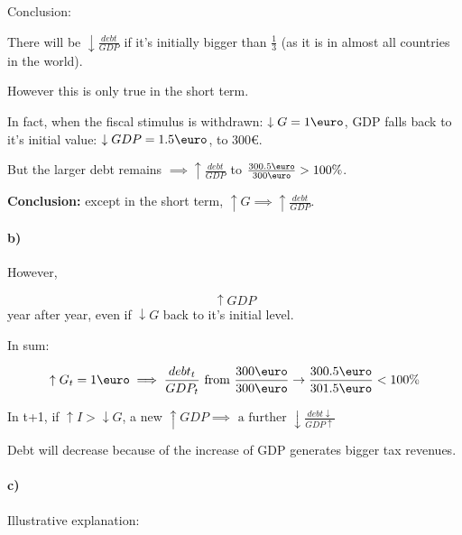 \documentclass{report}
\begin{document}
Conclusion: 

There will be $\downarrow \frac{debt}{GDP}$ if it's initially bigger than $\frac{1}{3}$ (as it is in almost all countries in the world).

However this is only true in the short term. 

In fact, when the fiscal stimulus is withdrawn: $\downarrow G=1\text{\euro}$, GDP falls back to it's initial value: $\downarrow GDP=1.5\text{\euro}$, to 300\euro. 

But the larger debt remains $\implies \uparrow \frac{debt}{GDP}$ to $\frac{300.5\text{\euro}}{300\text{\euro}}>100\%$. 

\textbf{Conclusion:} except in the short term, $\uparrow G \implies \uparrow \frac{debt}{GDP}$. 

\paragraph{b)} However, 

\begin{figure}[!h]
    \centering
{}
\end{figure}

$$\uparrow GDP$$ year after year, even if $\downarrow G$ back to it's initial level. 

In sum: 

\begin{equation*}
    \uparrow G_t=1\text{\euro} \implies \frac{debt_t}{GDP_t} \text{ from } \frac{300\text{\euro}}{300\text{\euro}} \rightarrow \frac{300.5\text{\euro}}{301.5\text{\euro}}<100\%
\end{equation*}

\begin{description}
    \item In t+1, if $\uparrow I>\downarrow G$, a new $\uparrow GDP \implies \text{ a further } \downarrow \frac{debt \downarrow}{GDP \uparrow}$
\end{description}
Debt will decrease because of the increase of GDP generates bigger tax revenues. 

\paragraph{c)} Illustrative explanation: 
\end{document}
